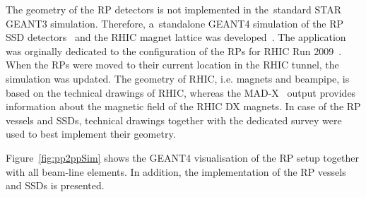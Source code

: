 The geometry of the \ac{RP} detectors is not implemented in the~standard \ac{STAR} GEANT3 simulation. Therefore, a~standalone GEANT4 simulation of the \ac{RP} \ac{SSD} detectors~\cite{RafalInz,RafalMgr} and the \ac{RHIC} magnet lattice was developed~\cite{LukaszInz,LukaszMgr}. The application was orginally dedicated to the configuration of the \ac{RP}s for RHIC Run 2009~\cite{pp2pp:elastic}. When the \ac{RP}s were moved to their current location in the \ac{RHIC} tunnel, the simulation was updated. The geometry of  \ac{RHIC}, i.e. magnets and beampipe, is based on the technical drawings of  \ac{RHIC}, whereas the MAD-X~\cite{MADX} output provides information about the magnetic field of the RHIC DX magnets. In case of the \ac{RP} vessels and \ac{SSD}s, technical drawings together with the dedicated survey were used to best implement their geometry.

Figure~\ref{fig:pp2ppSim} shows the GEANT4 visualisation of the \ac{RP} setup together with all beam-line elements. In addition, the  implementation of the \ac{RP} vessels and \ac{SSD}s is  presented. 



 
